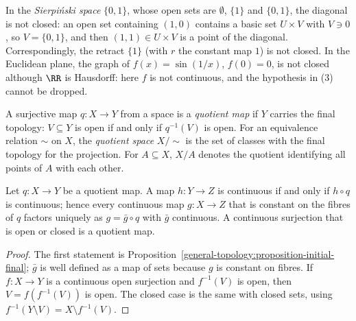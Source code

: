 \begin{counterexample}\label{general-topology:counterexample-diagonal}
In the \emph{Sierpi\'nski space} $\{0, 1\}$, whose open sets are $\emptyset$, $\{1\}$ and $\{0, 1\}$, the diagonal is not closed: an open set containing $(1, 0)$ contains a basic set $U \times V$ with $V \ni 0$, so $V = \{0, 1\}$, and then $(1, 1) \in U \times V$ is a point of the diagonal.
Correspondingly, the retract $\{1\}$ (with $r$ the constant map $1$) is not closed. In the Euclidean plane, the graph of $f(x) = \sin(1/x)$, $f(0) = 0$, is not closed although $\RR$ is Hausdorff: here $f$ is not continuous, and the hypothesis in (3)
cannot be dropped.
\end{counterexample}

\begin{definition}\label{general-topology:definition-quotient}
A surjective map $q \colon X \to Y$ from a space is a \emph{quotient map} if $Y$ carries the final topology: $V \subseteq Y$ is open if and only if
$q^{-1}(V)$ is open. For an equivalence relation $\sim$ on $X$, the \emph{quotient space} $X/{\sim}$ is the set of classes with the final topology for
the projection. For $A \subseteq X$, $X/A$ denotes the quotient identifying all points of $A$ with each other.
\end{definition}

\begin{proposition}\label{general-topology:proposition-quotient}
Let $q \colon X \to Y$ be a quotient map. A map $h \colon Y \to Z$ is continuous if and only if $h \circ q$ is continuous; hence every continuous map
$g \colon X \to Z$ that is constant on the fibres of $q$ factors uniquely as $g = \bar{g} \circ q$ with $\bar{g}$ continuous. A continuous surjection that
is open or closed is a quotient map.
\end{proposition}

\begin{proof}
The first statement is Proposition~\ref{general-topology:proposition-initial-final}; $\bar{g}$ is well defined as a map of sets because $g$ is
constant on fibres. If $f \colon X \to Y$ is a continuous open surjection and $f^{-1}(V)$ is open, then $V = f(f^{-1}(V))$ is open. The closed case
is the same with closed sets, using $f^{-1}(Y \setminus V) = X \setminus f^{-1}(V)$.
\end{proof}

